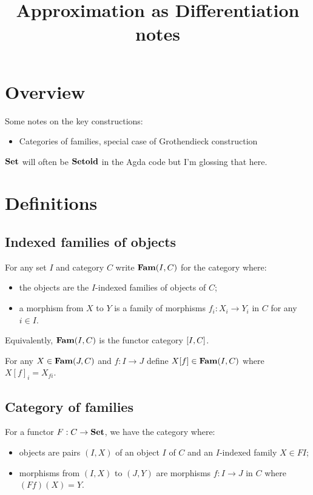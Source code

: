\documentclass[nonacm]{acmart}
\begin{document}
\title{Approximation as Differentiation notes}
\maketitle

\section{Overview}

Some notes on the key constructions:
\begin{itemize}
\item Categories of families, special case of Grothendieck construction
\end{itemize}

\noindent $\mathbf{Set}$ will often be $\mathbf{Setoid}$ in the Agda code but I'm glossing that here.

\section{Definitions}

\subsection{Indexed families of objects}

For any set $I$ and category $C$ write $\mathbf{Fam}(I,C)$ for the category where:
\begin{itemize}
\item the objects are the $I$-indexed families of objects of $C$;
\item a morphism from $X$ to $Y$ is a family of morphisms $f_i: X_i \to Y_i$ in $C$ for any $i \in I$.
\end{itemize}

\noindent Equivalently, $\mathbf{Fam}(I,C)$ is the functor category $[I,C]$.

\begin{definition}
For any $X \in \mathbf{Fam}(J,C)$ and $f: I \to J$ define $X[f] \in \mathbf{Fam}(I,C)$ where $X[f]_i = X_{fi}$.
\end{definition}

\subsection{Category of families}

For a functor $F: C \to \mathbf{Set}$, we have the category where:
\begin{itemize}
\item objects are pairs $(I, X)$ of an object $I$ of $C$ and an $I$-indexed family $X \in FI$;
\item morphisms from $(I, X)$ to $(J, Y)$ are morphisms $f: I \to J$ in $C$ where $(Ff)(X) = Y$.
\end{itemize}
\end{document}
